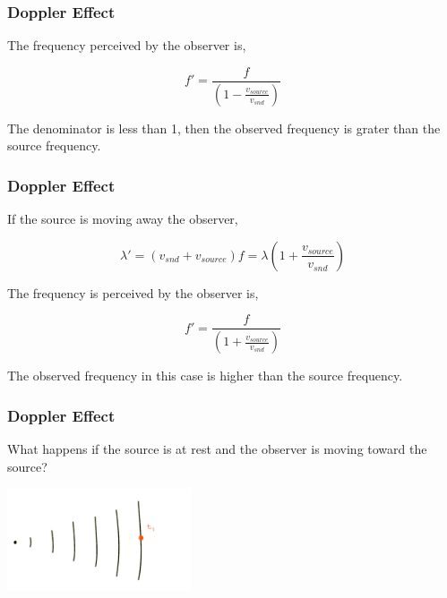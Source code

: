\documentclass[]{beamer}
\begin{document}

\begin{frame}
\frametitle{Doppler Effect}


The frequency perceived by the observer is,

\begin{equation}
f'=\frac{f}{(1-\frac{v_{source}}{v_{snd}})}
\end{equation}


The denominator is less than 1, then the observed frequency is grater than the source frequency.

  \end{frame}







\begin{frame}
\frametitle{Doppler Effect}


If the source is moving away the observer,

\begin{equation}
\lambda'=(v_{snd}+v_{source})f=\lambda(1+\frac{v_{source}}{v_{snd}})
\end{equation}

\pause

The frequency is perceived by the observer is,

\pause

\begin{equation}
f'=\frac{f}{(1+\frac{v_{source}}{v_{snd}})}
\end{equation}

\pause

The observed frequency in this case is higher than the source frequency.


  \end{frame}






\begin{frame}
\frametitle{Doppler Effect}


What happens if the source is at rest and the observer is moving toward the source?

\pause

  \begin{center}
  \includegraphics[height=1.2in]{images4/doppler5.jpg}
\end{center}


  \end{frame}
\end{document}
